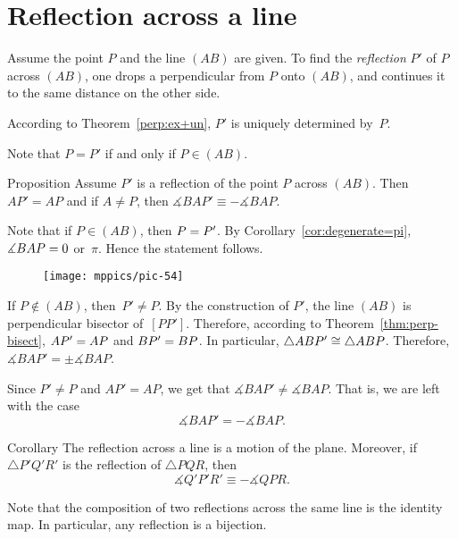 \section*{Reflection across a line}

Assume the point $P$ and the line $(AB)$ are given.
To find the \emph{reflection} $P'$ of $P$ across $(AB)$,
one drops a perpendicular from $P$ onto $(AB)$, 
and continues it to the same distance on the other side.

According to Theorem~\ref{perp:ex+un}, $P'$ is uniquely determined by~$P$.

Note that $P=P'$ if and only if $P\in(AB)$.

\begin{thm}[\abs]{Proposition}\label{prop:reflection}
Assume $P'$ is a reflection of the point $P$ across $(AB)$.
Then $AP'=AP$ 
and if $A\ne P$, 
then
$\measuredangle BAP'\equiv -\measuredangle BAP$.
\end{thm}

Note that if $P\in (AB)$, 
then $P\z=P'$. 
By Corollary~\ref{cor:degenerate=pi}, $\measuredangle BAP\z=0$ or~$\pi$.
Hence the statement follows.

{

\begin{wrapfigure}{o}{37mm}
\vskip-2mm
\centering
\texttt{[image: mppics/pic-54]}
\end{wrapfigure}

If $P\notin (AB)$, then~$P'\ne P$.
By the construction of $P'$, 
the line $(AB)$ is perpendicular bisector of~$[PP']$.
Therefore, according to Theorem~\ref{thm:perp-bisect}, $AP'\z=AP$ and $BP'\z=BP$.
In particular, 
$\triangle ABP'\z\cong \triangle ABP$.
Therefore, $\measuredangle BAP'=\pm \measuredangle BAP$.

Since $P'\ne P$ and $AP'=AP$,
we get that $\measuredangle BAP'\ne \measuredangle BAP$.
That is, we are left with the case
$$\measuredangle BAP'=-\measuredangle BAP.$$
\qedsf

}


\begin{thm}[\abs]{Corollary}\label{cor:reflection+angle}
The reflection across a line is a motion of the plane. 
Moreover, if $\triangle P'Q'R'$ is the reflection of $\triangle PQR$,
then 
$$\measuredangle Q'P'R'\equiv -\measuredangle QPR.$$

\end{thm}


Note that 
the composition of two reflections across the same line
is the identity map.
In particular, any reflection is a bijection.

